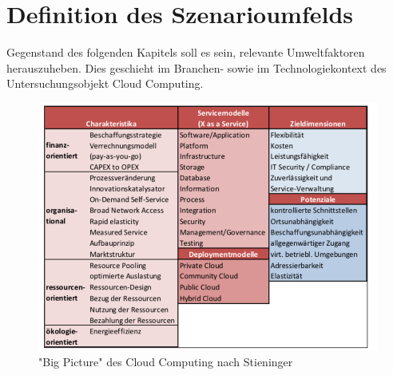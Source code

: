 \section{Definition des Szenarioumfelds}
\label{environment}

Gegenstand des folgenden Kapitels soll es sein, relevante Umweltfaktoren herauszuheben. Dies geschieht  im Branchen- sowie im Technologiekontext des Untersuchungsobjekt Cloud Computing. 


\begin{figure}
	\centering
	\includegraphics[width=\linewidth]{images/bigpicture}
	\caption[Caption for parameters]{ "Big Picture" des Cloud Computing nach Stieninger \cite{stieninger}}
	\label{fig:bigpicture}
\end{figure}